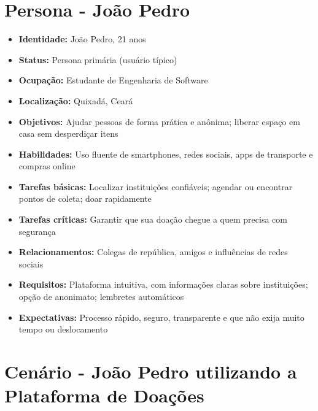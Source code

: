 \documentclass[a4paper,12pt]{article}
\begin{document}
\section{Persona - João Pedro}

\begin{itemize}
    \item \textbf{Identidade:} João Pedro, 21 anos
    \item \textbf{Status:} Persona primária (usuário típico)
    \item \textbf{Ocupação:} Estudante de Engenharia de Software
    \item \textbf{Localização:} Quixadá, Ceará
    \item \textbf{Objetivos:} Ajudar pessoas de forma prática e anônima; liberar espaço em casa sem desperdiçar itens
    \item \textbf{Habilidades:} Uso fluente de smartphones, redes sociais, apps de transporte e compras online
    \item \textbf{Tarefas básicas:} Localizar instituições confiáveis; agendar ou encontrar pontos de coleta; doar rapidamente
    \item \textbf{Tarefas críticas:} Garantir que sua doação chegue a quem precisa com segurança
    \item \textbf{Relacionamentos:} Colegas de república, amigos e influências de redes sociais
    \item \textbf{Requisitos:} Plataforma intuitiva, com informações claras sobre instituições; opção de anonimato; lembretes automáticos
    \item \textbf{Expectativas:} Processo rápido, seguro, transparente e que não exija muito tempo ou deslocamento
\end{itemize}

\section{Cenário - João Pedro utilizando a Plataforma de Doações}
\end{document}
